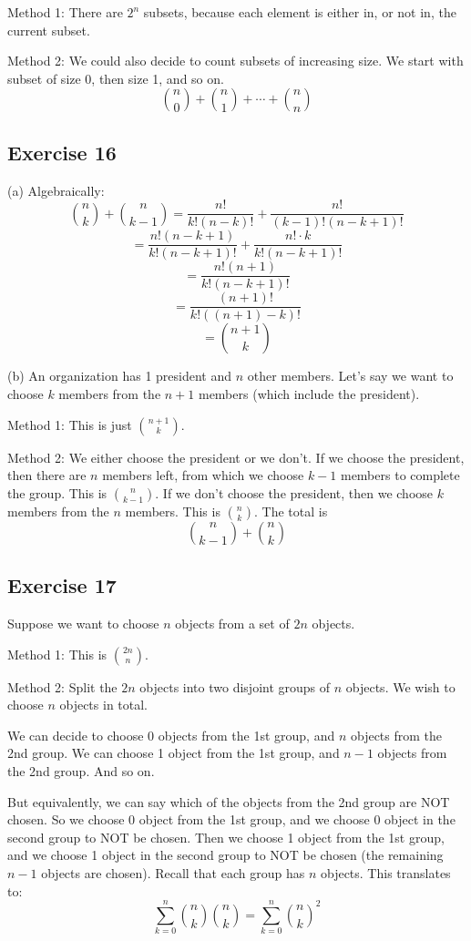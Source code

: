 \documentclass{book}
\begin{document}
Method 1: There are $2^n$ subsets, because each element is either in, or not in, the current subset.

Method 2: We could also decide to count subsets of increasing size. We start with subset of size 0, then size 1, and so on.
$$\binom{n}{0} + \binom{n}{1} + \cdots + \binom{n}{n}$$

\subsection*{Exercise 16}
(a) Algebraically:
$$\binom{n}{k} + \binom{n}{k - 1} = \frac{n!}{k!(n - k)!} + \frac{n!}{(k - 1)!(n - k + 1)!}$$
$$= \frac{n! (n - k + 1)}{k!(n - k + 1)!} + \frac{n! \cdot k}{k!(n - k + 1)!}$$
$$= \frac{n! (n + 1)}{k! (n - k + 1)!}$$
$$= \frac{(n + 1)!}{k! ((n + 1) - k)!}$$
$$= \binom{n + 1}{k}$$

\noindent
(b) An organization has 1 president and $n$ other members. Let's say we want to choose $k$ members from the $n + 1$ members (which include the president).

Method 1: This is just $\binom{n + 1}{k}$.

Method 2: We either choose the president or we don't. If we choose the president, then there are $n$ members left, from which we choose $k - 1$ members to complete the group. This is $\binom{n}{k - 1}$. If we don't choose the president, then we choose $k$ members from the $n$ members. This is $\binom{n}{k}$. The total is
$$\binom{n}{k - 1} + \binom{n}{k}$$

\subsection*{Exercise 17}
Suppose we want to choose $n$ objects from a set of $2n$ objects.

Method 1: This is $\binom{2n}{n}$.

Method 2: Split the $2n$ objects into two disjoint groups of $n$ objects. We wish to choose $n$ objects in total.

We can decide to choose 0 objects from the 1st group, and $n$ objects from the 2nd group. We can choose 1 object from the 1st group, and $n - 1$ objects from the 2nd group. And so on.

But equivalently, we can say which of the objects from the 2nd group are NOT chosen. So we choose 0 object from the 1st group, and we choose 0 object in the second group to NOT be chosen. Then we choose 1 object from the 1st group, and we choose 1 object in the second group to NOT be chosen (the remaining $n - 1$ objects are chosen). Recall that each group has $n$ objects. This translates to:
$$\sum_{k = 0}^n \binom{n}{k} \binom{n}{k} = \sum_{k = 0}^n \binom{n}{k} ^ 2$$
\end{document}
